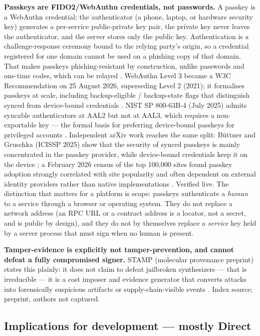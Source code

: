 \documentclass[11pt]{article}
\begin{document}
\textbf{Passkeys are FIDO2/WebAuthn credentials, not passwords.}
A passkey is a WebAuthn credential: the authenticator (a phone,
laptop, or hardware security key) generates a per-service
public-private key pair, the private key never leaves the
authenticator, and the server stores only the public key.
Authentication is a challenge-response ceremony bound to the relying
party's origin, so a credential registered for one domain cannot be
used on a phishing copy of that domain. That makes passkeys
phishing-resistant by construction, unlike passwords and one-time
codes, which can be relayed \cite{webauthn3,nist80063b4}. WebAuthn
Level 3 became a W3C Recommendation on 25 August 2026, superseding
Level 2 (2021); it formalises passkeys at scale, including
backup-eligible / backup-state flags that distinguish synced from
device-bound credentials \cite{webauthn3}. NIST SP 800-63B-4 (July
2025) admits syncable authenticators at AAL2 but not at AAL3, which
requires a non-exportable key --- the formal basis for preferring
device-bound passkeys for privileged accounts \cite{nist80063b4}.
Independent arXiv work reaches the same split: B\"uttner and Gruschka
(ICISSP 2025) show that the security of synced passkeys is mainly
concentrated in the passkey provider, while device-bound credentials
keep it on the device \cite{buttner2025}; a February 2026 census of
the top 100,000 sites found passkey adoption strongly correlated with
site popularity and often dependent on external identity providers
rather than native implementations \cite{bhardwaj2026}. Verified live. The distinction that matters for a
platform is scope: passkeys authenticate a \emph{human} to a service
through a browser or operating system. They do not replace a network
address (an RPC URL or a contract address is a locator, not a secret,
and is public by design), and they do not by themselves replace a
\emph{service} key held by a server process that must sign when no
human is present.

\textbf{Tamper-evidence is explicitly not tamper-prevention, and cannot
defeat a fully compromised signer.} STAMP (molecular provenance
preprint) states this plainly: it does not claim to defeat jailbroken
synthesizers --- that is irreducible --- it is a cost imposer and
evidence generator that converts attacks into forensically suspicious
artifacts or supply-chain-visible events \cite{stamp}. Index source;
preprint, authors not captured.

\subsection{Implications for development --- mostly Direct}
\end{document}
